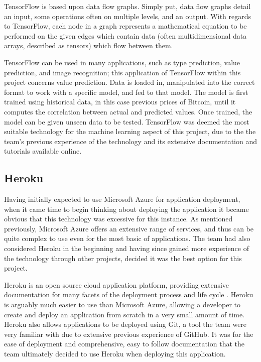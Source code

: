 TensorFlow is based upon data flow graphs. Simply put, data flow graphs detail an input, some operations often on multiple levels, and an output. With regards to TensorFlow, each node in a graph represents a mathematical equation to be performed on the given edges which contain data (often multidimensional data arrays, described as tensors) which flow between them.

TensorFlow can be used in many applications, such as type prediction, value prediction, and image recognition; this application of TensorFlow within this project concerns value prediction. Data is loaded in, manipulated into the correct format to work with a specific model, and fed to that model. The model is first trained using historical data, in this case previous prices of Bitcoin, until it computes the correlation between actual and predicted values. Once trained, the model can be given unseen data to be tested. TensorFlow was deemed the most suitable technology for the machine learning aspect of this project, due to the the team's previous experience of the technology and its extensive documentation and tutorials available online.

\subsection{Heroku}
Having initially expected to use Microsoft Azure for application deployment, when it came time to begin thinking about deploying the application it became obvious that this technology was excessive for this instance. As mentioned previously, Microsoft Azure offers an extensive range of services, and thus can be quite complex to use even for the most basic of applications. The team had also considered Heroku in the beginning and having since gained more experience of the technology through other projects, decided it was the best option for this project. 

Heroku is an open source cloud application platform, providing extensive documentation for many facets of the deployment process and life cycle \cite{herdep}. Heroku is arguably much easier to use than Microsoft Azure, allowing a developer to create and deploy an application from scratch in a very small amount of time. Heroku also allows applications to be deployed using Git, a tool the team were very familiar with due to extensive previous experience of GitHub. It was for the ease of deployment and comprehensive, easy to follow documentation that the team ultimately decided to use Heroku when deploying this application.